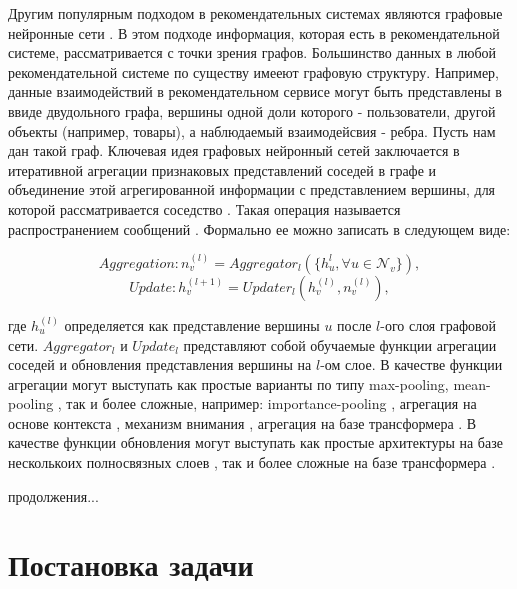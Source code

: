 \documentclass{article}
\begin{document}
Другим популярным подходом в рекомендательных системах являются графовые нейронные 
сети \cite{lightgcn,lightgcl,hetergcl,herograph,slgcn}. В этом подходе информация, которая есть в рекомендательной 
системе, рассматривается с точки зрения графов. Большинство данных в любой рекомендательной системе по
существу имееют графовую структуру. Например, данные взаимодействий в рекомендательном сервисе могут быть
представлены в ввиде двудольного графа, вершины одной доли которого - пользователи, другой объекты (например, товары), а
наблюдаемый взаимодейсвия - ребра. Пусть нам дан такой граф. Ключевая идея графовых нейронный сетей заключается в
итеративной агрегации признаковых представлений соседей в графе и объединение этой агрегированной информации
с представлением вершины, для которой рассматривается соседство \cite{survey1}. Такая операция называется распространением
сообщений \cite{lightgcn,sage}. Формально ее можно записать в следующем виде:

$$
Aggregation: n^{(l)}_v = Aggregator_l(\{h^l_u, \forall u \in \mathcal{N}_v\}),
$$
$$
Update: h^{(l + 1)}_v = Updater_l(h_v^{(l)}, n_v^{(l)}),
$$

где $h_u^{(l)}$ определяется как представление вершины $u$ после $l$-ого слоя графовой сети. $Aggregator_l$ и $Update_l$
представляют собой обучаемые функции агрегации соседей и обновления представления вершины на $l$-ом слое. В качестве функции 
агрегации могут выступать как простые варианты по типу max-pooling, mean-pooling \cite{sage}, так и более сложные, например: 
importance-pooling \cite{pinsage}, агрегация на основе контекста \cite{multisage}, механизм внимания \cite{gat}, агрегация
на базе трансформера \cite{multibisage}. В качестве функции обновления могут выступать как простые архитектуры на базе несколькоих
полносвязных слоев \cite{sage, pinsage}, так и более сложные на базе трансформера \cite{multibisage}.


продолжения...




\section{Постановка задачи}
\end{document}
